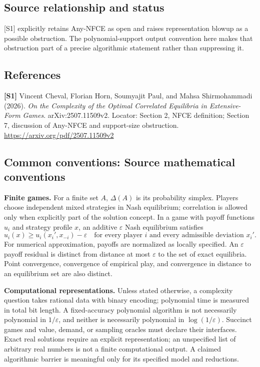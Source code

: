 \documentclass[11pt,a4paper]{article}
\begin{document}
\subsection*{Source relationship and status}
[S1] explicitly retains Any-NFCE as open and raises representation blowup as a possible obstruction. The polynomial-support output convention here makes that obstruction part of a precise algorithmic statement rather than suppressing it.
\subsection*{References}
\begingroup\footnotesize\raggedright
{\footnotesize\raggedright
\textbf{[S1]} Vincent Cheval, Florian Horn, Soumyajit Paul, and Mahsa Shirmohammadi (2026). \emph{On the Complexity of the Optimal Correlated Equilibria in Extensive-Form Games}. arXiv:2507.11509v2. Locator: Section 2, NFCE definition; Section 7, discussion of Any-NFCE and support-size obstruction. \url{https://arxiv.org/pdf/2507.11509v2}\par}
\par\endgroup

\subsection*{Common conventions: Source mathematical conventions}

\textbf{Finite games.} For a finite set $A$, $\Delta(A)$ is its probability
simplex. Players choose independent mixed strategies in Nash equilibrium;
correlation is allowed only when explicitly part of the solution concept.
In a game with payoff functions $u_i$ and strategy profile $x$, an additive
$\varepsilon$ Nash equilibrium satisfies
\[
 u_i(x)\geq u_i(x_i',x_{-i})-\varepsilon
 \quad\text{for every player $i$ and every admissible deviation $x_i'$}.
\]
For numerical approximation, payoffs are normalized as locally specified.
An $\varepsilon$ payoff residual is distinct from distance at most
$\varepsilon$ to the set of exact equilibria. Point convergence, convergence
of empirical play, and convergence in distance to an equilibrium set are
also distinct.

\textbf{Computational representations.} Unless stated otherwise, a complexity
question takes rational data with binary encoding; polynomial time is measured
in total bit length. A fixed-accuracy polynomial algorithm is not necessarily
polynomial in $1/\varepsilon$, and neither is necessarily polynomial in
$\log(1/\varepsilon)$. Succinct games and value, demand, or sampling oracles
must declare their interfaces. Exact real solutions require an explicit
representation; an unspecified list of arbitrary real numbers is not a
finite computational output. A claimed algorithmic barrier is meaningful
only for its specified model and reductions.
\end{document}
